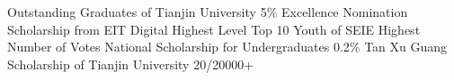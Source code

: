 %
%
%


\begin{scholarship}
					{Outstanding Graduates of Tianjin University}
                    {5\%}
					{Excellence Nomination Scholarship from EIT Digital}
                    {Highest Level}
					{Top 10 Youth of SEIE}
                    {Highest Number of Votes}
					{National Scholarship for Undergraduates}
                    {0.2\%}
    				{Tan Xu Guang Scholarship of Tianjin University}
                    {20/20000+}
\end{scholarship}
